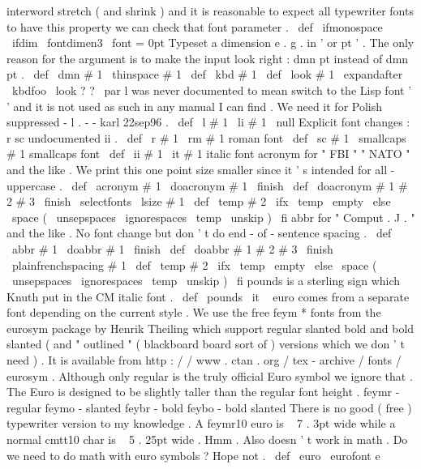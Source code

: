 interword
stretch
(
and
%
shrink
)
and
it
is
reasonable
to
expect
all
typewriter
fonts
to
have
%
this
property
we
can
check
that
font
parameter
.
%
\
def
\
ifmonospace
{
\
ifdim
\
fontdimen3
\
font
=
0pt
}
%
Typeset
a
dimension
e
.
g
.
in
'
or
pt
'
.
The
only
reason
for
the
%
argument
is
to
make
the
input
look
right
:
dmn
{
pt
}
instead
of
dmn
{
}
pt
.
%
\
def
\
dmn
#
1
{
\
thinspace
#
1
}
\
def
\
kbd
#
1
{
\
def
\
look
{
#
1
}
\
expandafter
\
kbdfoo
\
look
?
?
\
par
}
%
l
was
never
documented
to
mean
switch
to
the
Lisp
font
'
'
%
and
it
is
not
used
as
such
in
any
manual
I
can
find
.
We
need
it
for
%
Polish
suppressed
-
l
.
-
-
karl
22sep96
.
%
\
def
\
l
#
1
{
{
\
li
#
1
}
\
null
}
%
Explicit
font
changes
:
r
sc
undocumented
ii
.
\
def
\
r
#
1
{
{
\
rm
#
1
}
}
%
roman
font
\
def
\
sc
#
1
{
{
\
smallcaps
#
1
}
}
%
smallcaps
font
\
def
\
ii
#
1
{
{
\
it
#
1
}
}
%
italic
font
%
acronym
for
"
FBI
"
"
NATO
"
and
the
like
.
%
We
print
this
one
point
size
smaller
since
it
'
s
intended
for
%
all
-
uppercase
.
%
\
def
\
acronym
#
1
{
\
doacronym
#
1
\
finish
}
\
def
\
doacronym
#
1
#
2
#
3
\
finish
{
%
{
\
selectfonts
\
lsize
#
1
}
%
\
def
\
temp
{
#
2
}
%
\
ifx
\
temp
\
empty
\
else
\
space
(
{
\
unsepspaces
\
ignorespaces
\
temp
\
unskip
}
)
%
\
fi
}
%
abbr
for
"
Comput
.
J
.
"
and
the
like
.
%
No
font
change
but
don
'
t
do
end
-
of
-
sentence
spacing
.
%
\
def
\
abbr
#
1
{
\
doabbr
#
1
\
finish
}
\
def
\
doabbr
#
1
#
2
#
3
\
finish
{
%
{
\
plainfrenchspacing
#
1
}
%
\
def
\
temp
{
#
2
}
%
\
ifx
\
temp
\
empty
\
else
\
space
(
{
\
unsepspaces
\
ignorespaces
\
temp
\
unskip
}
)
%
\
fi
}
%
pounds
{
}
is
a
sterling
sign
which
Knuth
put
in
the
CM
italic
font
.
%
\
def
\
pounds
{
{
\
it
\
}
}
%
euro
{
}
comes
from
a
separate
font
depending
on
the
current
style
.
%
We
use
the
free
feym
*
fonts
from
the
eurosym
package
by
Henrik
%
Theiling
which
support
regular
slanted
bold
and
bold
slanted
(
and
%
"
outlined
"
(
blackboard
board
sort
of
)
versions
which
we
don
'
t
need
)
.
%
It
is
available
from
http
:
/
/
www
.
ctan
.
org
/
tex
-
archive
/
fonts
/
eurosym
.
%
%
Although
only
regular
is
the
truly
official
Euro
symbol
we
ignore
%
that
.
The
Euro
is
designed
to
be
slightly
taller
than
the
regular
%
font
height
.
%
%
feymr
-
regular
%
feymo
-
slanted
%
feybr
-
bold
%
feybo
-
bold
slanted
%
%
There
is
no
good
(
free
)
typewriter
version
to
my
knowledge
.
%
A
feymr10
euro
is
~
7
.
3pt
wide
while
a
normal
cmtt10
char
is
~
5
.
25pt
wide
.
%
Hmm
.
%
%
Also
doesn
'
t
work
in
math
.
Do
we
need
to
do
math
with
euro
symbols
?
%
Hope
not
.
%
%
\
def
\
euro
{
{
\
eurofont
e
}
}
\
